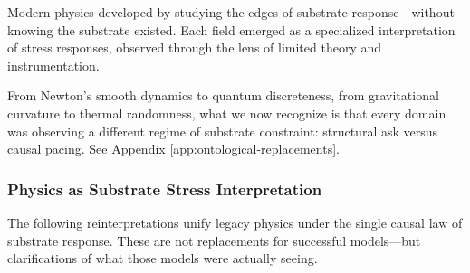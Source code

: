 \documentclass[entropy,article,submit,pdftex,moreauthors]{Definitions/mdpi}
\begin{document}
Modern physics developed by studying the edges of substrate response—without knowing the substrate existed. Each field emerged as a specialized interpretation of stress responses, observed through the lens of limited theory and instrumentation.

From Newton’s smooth dynamics to quantum discreteness, from gravitational curvature to thermal randomness, what we now recognize is that every domain was observing a different regime of substrate constraint: structural ask versus causal pacing. See Appendix \ref{app:ontological-replacements}.

\subsubsection*{Physics as Substrate Stress Interpretation}

The following reinterpretations unify legacy physics under the single causal law of substrate response. These are not replacements for successful models—but clarifications of what those models were actually seeing.
\end{document}
